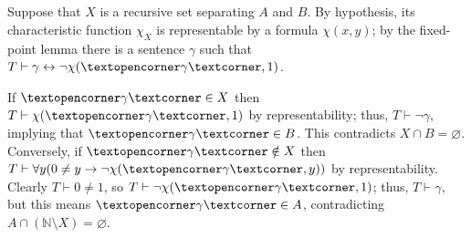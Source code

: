 \documentclass[a4paper]{article}
\newcommand{\el}[1]{\text{\textopencorner}#1\text{\textcorner}}
\begin{document}
\section{}
Suppose that $X$ is a recursive set separating $A$ and $B$.
By hypothesis, its characteristic function $\chi_X$ is representable by a formula $\chi(x,y)$; by the fixed-point lemma there is a sentence $\gamma$ such that $T \vdash \gamma \leftrightarrow \lnot\chi(\el{\gamma},1)$.

If $\el{\gamma} \in X$ then $T \vdash \chi(\el{\gamma},1)$ by representability; thus, $T \vdash \lnot\gamma$, implying that $\el{\gamma} \in B$.
This contradicts $X \cap B = \varnothing$.
Conversely, if $\el{\gamma} \notin X$ then $T \vdash \forall y(0 \neq y \to \lnot\chi(\el{\gamma},y))$ by representability.
Clearly $T \vdash 0 \neq 1$, so $T \vdash \lnot\chi(\el{\gamma},1)$; thus, $T \vdash \gamma$, but this means $\el{\gamma} \in A$, contradicting $A \cap (\mathbb{N} \setminus X) = \varnothing$.

\end{document}
